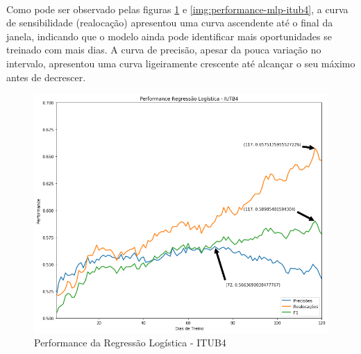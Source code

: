 \documentclass[grad,numbers]{coppe}
\begin{document}
        \paragraph{}Como pode ser observado pelas figuras \ref{img:performance-logreg-itub4} e \ref{img:performance-mlp-itub4}, a curva de sensibilidade (realocação) apresentou uma curva ascendente até o final da janela, indicando que o modelo ainda pode identificar mais oportunidades se treinado com mais dias. A curva de precisão, apesar da pouca variação no intervalo, apresentou uma curva ligeiramente crescente até alcançar o seu máximo antes de decrescer.
        
        \begin{figure}[h!]
                \caption{Performance da Regressão Logística - ITUB4}
                \label{img:performance-logreg-itub4}
                \includegraphics[width=13.1cm]{performance-logreg-itub4.png}
                \centering
            \end{figure}
            
\end{document}
